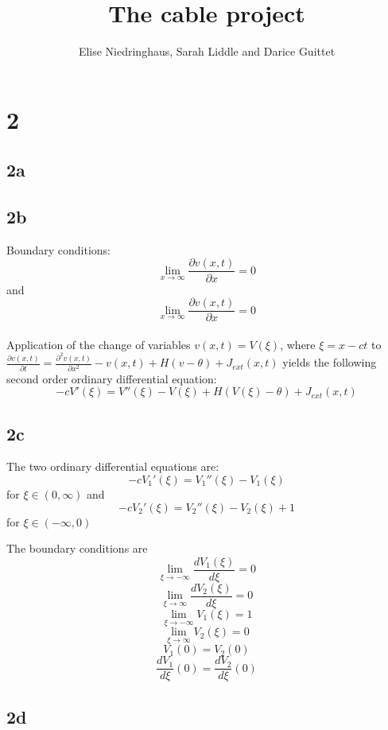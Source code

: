 \documentclass[11pt, oneside]{article}   	%
\title{The cable project}
\author{Elise Niedringhaus, Sarah Liddle and Darice Guittet}
\begin{document}
\maketitle
\section{2}
\subsection{2a}
\subsection{2b}
Boundary conditions:\\
$$\lim_{x\to\infty} \frac{\partial v(x,t)}{\partial x}=0$$ and $$\lim_{x\to\infty} \frac{\partial v(x,t)}{\partial x}=0$$\\
Application of the change of variables $v(x,t)=V(\xi)$, where $\xi=x-ct$ to $\frac{\partial v(x,t)}{\partial t}=\frac{\partial ^2 v(x,t)}{\partial x^2}-v(x,t)+H(v-\theta)+J_{ext}(x,t)$ yields the following second order ordinary differential equation:\\
\begin{equation}
\label{second order ODE}
-cV'(\xi)=V''(\xi)-V(\xi)+H(V(\xi)-\theta)+J_{ext}(x,t)
\end{equation}
\subsection{2c}

The two ordinary differential equations are:\\
\begin{equation}
\label{ODE1}
-cV_1'(\xi)=V_1''(\xi)-V_1(\xi)
\end{equation}
for  $\xi \in (0,\infty)$ and\\

\begin{equation}
\label{ODE2} 
-cV_2'(\xi)=V_2''(\xi)-V_2(\xi)+1
\end{equation}
for $\xi \in (-\infty,0)$

The boundary conditions are\\
$$\lim_{\xi\to-\infty} \frac{d V_1(\xi)}{d \xi}=0$$
$$\lim_{\xi\to\infty} \frac{d V_2(\xi)}{d \xi}=0$$
$$\lim_{\xi\to-\infty} V_1(\xi)=1$$
$$\lim_{\xi\to\infty} V_2(\xi)=0$$
$$V_1(0)=V_2(0)$$
$$\frac{d V_1}{d \xi}(0)=\frac{d V_2}{d \xi}(0)$$
\subsection{2d}
\end{document}
